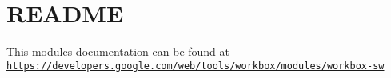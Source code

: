 \chapter{README}
\hypertarget{md_pkiclassroomrescheduler_2src_2main_2frontend_2node__modules_2workbox-sw_2_r_e_a_d_m_e}{}\label{md_pkiclassroomrescheduler_2src_2main_2frontend_2node__modules_2workbox-sw_2_r_e_a_d_m_e}
This module\textquotesingle{}s documentation can be found at \href{https://developers.google.com/web/tools/workbox/modules/workbox-sw}{\texttt{ https\+://developers.\+google.\+com/web/tools/workbox/modules/workbox-\/sw}} 
